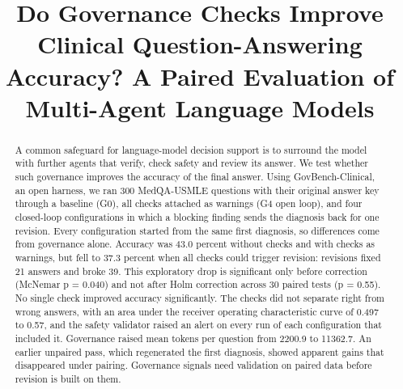 \documentclass[conference]{IEEEtran}
\begin{document}
\title{Do Governance Checks Improve Clinical Question-Answering Accuracy? A Paired Evaluation of Multi-Agent Language Models}

\author{
\and
{}
\and
{}
\and
{}
}

\maketitle

\begin{abstract}
A common safeguard for language-model decision support is to surround the model with further agents that verify,
check safety and review its answer. We test whether such governance improves the accuracy of the final answer. Using GovBench-Clinical, an open
harness, we ran 300 MedQA-USMLE questions with their original answer key through a baseline (G0), all checks attached
as warnings (G4 open loop), and four closed-loop configurations in which a blocking finding sends the diagnosis back
for one revision. Every configuration started from the same first diagnosis, so differences come from governance
alone. Accuracy was 43.0 percent without checks and with checks as warnings, but fell to 37.3 percent when all
checks could trigger revision: revisions fixed 21 answers and broke 39. This exploratory drop is significant only
before correction (McNemar p = 0.040) and not after Holm correction across 30 paired tests (p = 0.55). No single
check improved accuracy significantly. The checks did not separate right from wrong answers, with an area under the
receiver operating characteristic curve of 0.497 to 0.57, and the safety validator raised an alert on every run of
each configuration that included it. Governance raised mean tokens per question from 2200.9 to 11362.7. An earlier
unpaired pass, which regenerated the first diagnosis, showed apparent gains that disappeared under pairing.
Governance signals need validation on paired data before revision is built on them.
\end{abstract}
\end{document}
